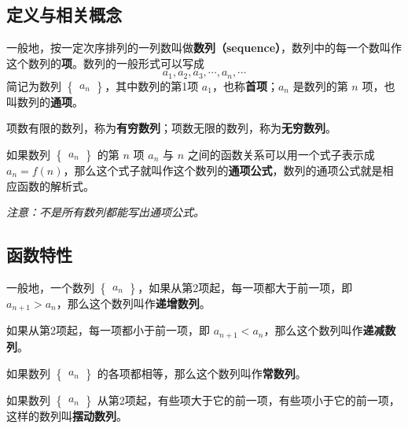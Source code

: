 

\subsection{定义与相关概念}
一般地，按一定次序排列的一列数叫做\textbf{数列（sequence）}，数列中的每一个数叫作这个数列的\textbf{项}。数列的一般形式可以写成
\begin{equation}
a_1,a_2,a_3,\cdots,a_n,\cdots
\end{equation}
简记为数列 $\begin{Bmatrix} a_n \end{Bmatrix}$，其中数列的第1项 $a_1$，也称\textbf{首项}；$a_n$ 是数列的第 $n$ 项，也叫数列的\textbf{通项}。

项数有限的数列，称为\textbf{有穷数列}；项数无限的数列，称为\textbf{无穷数列}。

如果数列 $\begin{Bmatrix} a_n \end{Bmatrix}$ 的第 $n$ 项 $a_n$ 与 $n$ 之间的函数关系可以用一个式子表示成 $a_n = f(n)$，那么这个式子就叫作这个数列的\textbf{通项公式}，数列的通项公式就是相应函数的解析式。

\textsl{注意：不是所有数列都能写出通项公式。}

\subsection{函数特性}
一般地，一个数列 $\begin{Bmatrix} a_n \end{Bmatrix}$，如果从第2项起，每一项都大于前一项，即 $a_{n+1}>a_n$，那么这个数列叫作\textbf{递增数列}。

如果从第2项起，每一项都小于前一项，即 $a_{n+1}<a_n$，那么这个数列叫作\textbf{递减数列}。

如果数列 $\begin{Bmatrix} a_n \end{Bmatrix}$ 的各项都相等，那么这个数列叫作\textbf{常数列}。

如果数列 $\begin{Bmatrix} a_n \end{Bmatrix}$ 从第2项起，有些项大于它的前一项，有些项小于它的前一项，这样的数列叫\textbf{摆动数列}。